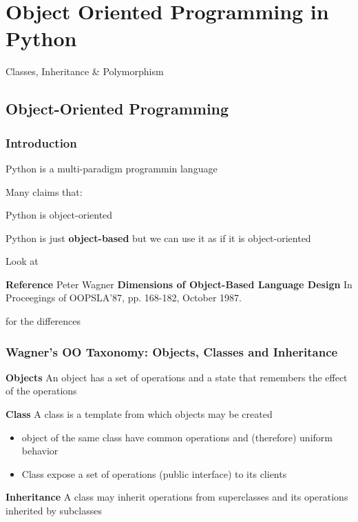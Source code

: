 \section{Object Oriented Programming in Python}

Classes, Inheritance & Polymorphism

\subsection{Object-Oriented Programming}

\subsubsection{Introduction}

Python is a multi-paradigm programmin language

Many claims that:

\begin{center}
Python is object-oriented
\end{center}

Python is just \textbf{object-based} but we can use it as if it is object-oriented

Look at

\begin{center}
\textbf{Reference}
Peter Wagner
\textbf{Dimensions of Object-Based Language Design}
In Proceegings of OOPSLA'87, pp. 168-182, October 1987.
\end{center}

for the differences

\subsubsection{Wagner’s OO Taxonomy: Objects, Classes and Inheritance}

\textbf{Objects}
An object has a set of operations and a state that remembers the effect of the operations

\textbf{Class}
A class is a template from which objects may be created

\begin{itemize}
	\item object of the same class have common operations and (therefore) uniform behavior
	\item Class expose a set of operations (public interface) to its clients
\end{itemize}

\textbf{Inheritance}
A class may inherit operations from superclasses and its operations inherited by subclasses

